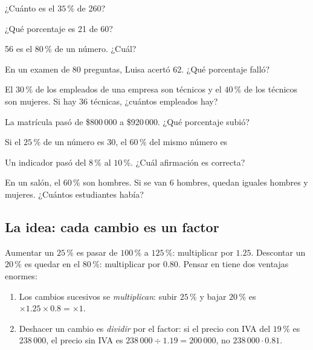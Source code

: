 \taller
{}
\begin{ejercicios}
\item ¿Cuánto es el $35\,\%$ de 260? 
\item ¿Qué porcentaje es 21 de 60? 
\item 56 es el $80\,\%$ de un número. ¿Cuál? 
\end{ejercicios}
\begin{ejercicios}
\item En un examen de 80 preguntas, Luisa acertó 62. ¿Qué porcentaje falló? 
\item El $30\,\%$ de los empleados de una empresa son técnicos y el $40\,\%$ de los técnicos son mujeres. Si hay 36 técnicas, ¿cuántos empleados hay? 
\item La matrícula pasó de \$800\,000 a \$920\,000. ¿Qué porcentaje subió? 
\end{ejercicios}
\begin{ejercicios}
\item Si el $25\,\%$ de un número es 30, el $60\,\%$ del mismo número es
\item Un indicador pasó del $8\,\%$ al $10\,\%$. ¿Cuál afirmación es correcta?
\item En un salón, el $60\,\%$ son hombres. Si se van 6 hombres, quedan iguales hombres y mujeres. ¿Cuántos estudiantes había?
\end{ejercicios}

\bitacora


\subsection{La idea: cada cambio es un factor}
Aumentar un $25\,\%$ es pasar de $100\,\%$ a $125\,\%$: multiplicar por $1.25$. Descontar un $20\,\%$ es quedar en el
$80\,\%$: multiplicar por $0.80$. Pensar en  tiene dos ventajas enormes:
\begin{enumerate}
  \item Los cambios sucesivos se \emph{multiplican}: subir $25\,\%$ y bajar $20\,\%$ es $\times 1.25 \times 0.8 = \times 1$.
  \item Deshacer un cambio es \emph{dividir} por el factor: si el precio con IVA del $19\,\%$ es 238\,000, el precio sin
  IVA es $238\,000 \div 1.19 = 200\,000$, no $238\,000 \cdot 0.81$.
\end{enumerate}

